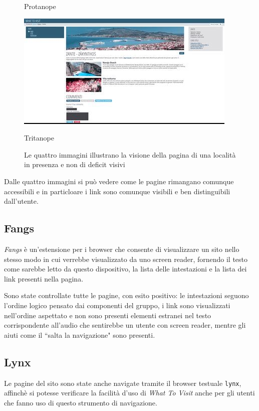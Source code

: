 \begin{figure}[h!]
\begin{minipage}[t]{0.45\textwidth}
\caption{Protanope}
\end{minipage}
\hspace{\fill}
\begin{minipage}[t]{0.45\textwidth}
\includegraphics[width=\linewidth]{images/screen/tritanope.jpg}
\caption{Tritanope}
\end{minipage}
\caption{Le quattro immagini illustrano la visione della pagina di una località in presenza e non di deficit visivi}\label{multiavp}
\end{figure}

Dalle quattro immagini si può vedere come le pagine rimangano comunque accessibili e
in particloare i link sono comunque visibili e ben distinguibili dall'utente.

\subsection{Fangs}\label{sec:fangs}
\textit{Fangs} è un'estensione per i browser che consente di visualizzare un
sito nello stesso modo in cui verrebbe visualizzato da uno screen reader,
fornendo il testo come sarebbe letto da questo dispositivo, la lista delle
intestazioni e la lista dei link presenti nella pagina.

Sono state controllate tutte le pagine, con esito positivo: le intestazioni
seguono l'ordine logico pensato dai componenti del gruppo, i link sono
visualizzati nell'ordine aspettato e non sono presenti elementi estranei nel
testo corrispondente all'audio che sentirebbe un utente con screen reader,
mentre gli aiuti come il ``salta la navigazione" sono presenti.

\subsection{Lynx}\label{sec:lynx}
Le pagine del sito sono state anche navigate tramite il browser testuale
\texttt{lynx}, affinchè si potesse verificare la facilità d'uso di
\textit{What To Visit} anche per gli utenti che fanno uso di questo
strumento di navigazione.

